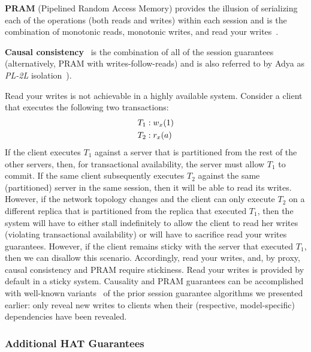 \vspace{.5em}\noindent\textbf{{PRAM}} (Pipelined Random Access Memory)
provides the illusion of serializing each of the operations (both
reads and writes) within each session and is the combination of
monotonic reads, monotonic writes, and read your
writes~\cite{herlihy-art}.

\vspace{.5em}\noindent\textbf{{Causal
    consistency}}~\cite{causalmemory} is the combination of all of the
session guarantees~\cite{sessiontocausal} (alternatively, PRAM with
writes-follow-reads) and is also referred to by Adya as \textit{PL-2L}
isolation~\cite{adya}).\vspace{.5em}

Read your writes is not achievable in a highly available
system. Consider a client that executes the following two transactions:
\begin{align*}
\small
T_1 &: w_x(1)
\\T_2 &: r_x(a)
\end{align*}
If the client executes $T_1$ against a server that is partitioned from
the rest of the other servers, then, for transactional availability,
the server must allow $T_1$ to commit. If the same client subsequently
executes $T_2$ against the same (partitioned) server in the same
session, then it will be able to read its writes. However, if the
network topology changes and the client can only execute $T_2$ on a
different replica that is partitioned from the replica that executed
$T_1$, then the system will have to either stall indefinitely to allow
the client to read her writes (violating transactional availability)
or will have to sacrifice read your writes guarantees. However, if the
client remains sticky with the server that executed $T_1$, then we can
disallow this scenario. Accordingly, read your writes, and, by proxy,
causal consistency and PRAM require stickiness. Read your writes is
provided by default in a sticky system. Causality and PRAM guarantees
can be accomplished with well-known variants~\cite{causalmemory,
  bolton, eiger, sessionguarantees, swift} of the prior session
guarantee algorithms we presented earlier: only reveal new writes to
clients when their (respective, model-specific) dependencies have been revealed.

\subsubsection{Additional HAT Guarantees}

